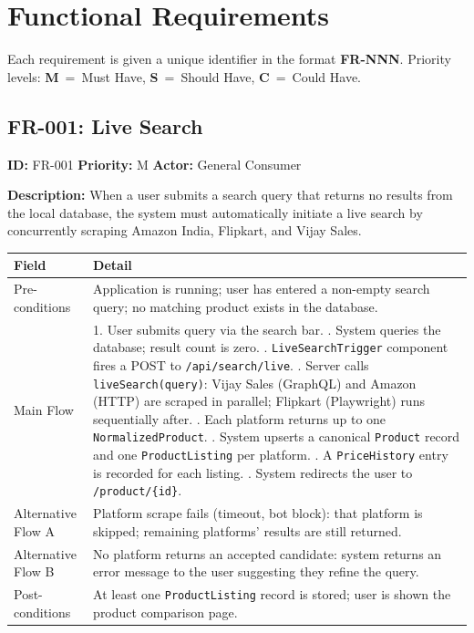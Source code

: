 \documentclass[12pt,a4paper]{report}
\begin{document}
\chapter{Functional Requirements}

Each requirement is given a unique identifier in the format \textbf{FR-NNN}.
Priority levels: \textbf{M}~=~Must Have, \textbf{S}~=~Should Have,
\textbf{C}~=~Could Have.

\section{FR-001: Live Search}

\begin{reqbox}
\textbf{ID:} FR-001 \quad \textbf{Priority:} M \quad \textbf{Actor:} General Consumer
\end{reqbox}

\textbf{Description:} When a user submits a search query that returns no results
from the local database, the system must automatically initiate a live search
by concurrently scraping Amazon India, Flipkart, and Vijay Sales.

\begin{longtable}{L{3cm} L{10cm}}
  \toprule
  \textbf{Field} & \textbf{Detail} \\
  \midrule
  \endhead
  Pre-conditions & Application is running; user has entered a non-empty search
                   query; no matching product exists in the database. \\[3pt]
  Main Flow &
    1. User submits query via the search bar. . System queries the database; result count is zero. . \texttt{LiveSearchTrigger} component fires a POST to
       \texttt{/api/search/live}. . Server calls \texttt{liveSearch(query)}: Vijay Sales (GraphQL) and
       Amazon (HTTP) are scraped in parallel; Flipkart (Playwright) runs
       sequentially after. . Each platform returns up to one \texttt{NormalizedProduct}. . System upserts a canonical \texttt{Product} record and one
       \texttt{ProductListing} per platform. . A \texttt{PriceHistory} entry is recorded for each listing. . System redirects the user to \texttt{/product/\{id\}}. \\[3pt]
  Alternative Flow A &
    Platform scrape fails (timeout, bot block): that platform is skipped;
    remaining platforms' results are still returned. \\[3pt]
  Alternative Flow B &
    No platform returns an accepted candidate: system returns an error message
    to the user suggesting they refine the query. \\[3pt]
  Post-conditions & At least one \texttt{ProductListing} record is stored; user
                    is shown the product comparison page. \\
  \bottomrule
\end{longtable}
\end{document}
